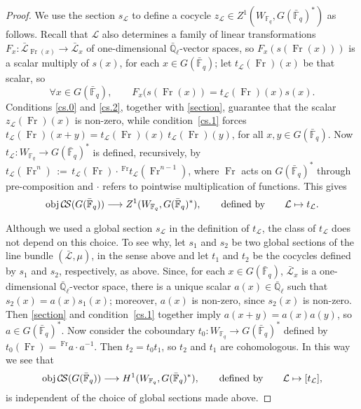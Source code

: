 \documentclass[11pt]{amsart}
\theoremstyle{plain}
\theoremstyle{definition}
\theoremstyle{remark}
\newcommand{\EE}{\mathbb{\bar Q}_\ell}
\newcommand{\bFq}{{\mathbb{\bar F}_q}}
\newcommand{\Fq}{{\mathbb{F}_q}}
\newcommand{\Frob}{{\operatorname{Fr}}}
\newcommand{\ceq}{{\, :=\, }}
\newcommand{\obj}{{\text{obj}\, }}
\newcommand{\cs}[1]{{\mathcal{#1}}}
\newcommand{\gcs}[1]{{\mathcal{\bar #1}}}
\newcommand{\CS}{{\mathcal{C\hskip-1.8pt S}}}
\newcommand\Clifton[1]{\marginpar{\smaller\smaller CC: #1}}
\begin{document}
\begin{proof}
We use the section $s_\cs{L}$ to define a cocycle $z_\cs{L} \in Z^1(W_\Fq,G(\bFq)^*)$ as follows. Recall that $\cs{L}$ also determines a family of linear transformations $F_x : \gcs{L}_{\Frob(x)} \to \gcs{L}_x$ of one-dimensional $\EE$-vector spaces,  so $F_x(s(\Frob(x)))$ is a scalar multiply of $s(x)$, for each $x\in G(\bFq)$; let $t_\cs{L}(\Frob)(x)$ be that scalar, so
\begin{equation}\label{t}
\forall x\in G(\bFq),\qquad F_{x}(s(\Frob(x)) = t_\cs{L}(\Frob)(x) s(x).
\end{equation}
Conditions \ref{cs.0} and \ref{cs.2}, together with \eqref{section}, guarantee that the scalar $z_\cs{L}(\Frob)(x)$ is non-zero, while condition~\ref{cs.1} forces $t_\cs{L}(\Frob)(x+y) = t_\cs{L}(\Frob)(x) \ t_\cs{L}(\Frob)(y)$, for all $x,y \in G(\bFq)$. 
Now $t_\cs{L} : W_\Fq \to G(\bFq)^*$ is defined, recursively, by $t_\cs{L}(\Frob^n) \ceq t_\cs{L}(\Frob)\cdot \,^\Frob t_\cs{L}(\Frob^{n-1})$, where $\Frob$ acts on $G(\bFq)^*$ through pre-composition and $\cdot$ refers to pointwise multiplication of functions. This gives
\[
\obj \CS(G(\bFq)) \longrightarrow Z^1(W_\Fq,G(\bFq)^*), \qquad \text{defined by} \qquad \cs{L} \mapsto t_\cs{L}.
\]

Although we used a global section $s_\cs{L}$ in the definition of $t_\cs{L}$, the class of $t_\cs{L}$ does not depend on this choice. To see why, let $s_1$ and $s_2$ be two global sections of the line bundle $(\gcs{L},\mu)$, in the sense above and let $t_1$ and $t_2$ be the cocycles defined by $s_1$ and $s_2$, respectively, as above. Since, for each $x\in G(\bFq)$, $\gcs{L}_x$ is a one-dimensional $\EE$-vector space, there is a unique scalar $a(x) \in \EE$ such that $s_2(x) = a(x) s_1(x)$; moreover, $a(x)$ is non-zero, since $s_2(x)$ is non-zero. Then \eqref{section} and condition~\ref{cs.1} together imply $a(x+y) = a(x)a(y)$, so $a\in G(\bFq)^*$. Now consider the  coboundary $t_0 : W_\Fq \to G(\bFq)^*$ defined by $t_0(\Frob) = \,^\Frob a \cdot a^{-1}$. Then $t_2 = t_0 t_1$, so $t_2$ and $t_1$ are cohomologous. In this way we see that
\begin{equation}\label{cohomologous}
\obj \CS(G(\bFq)) \longrightarrow H^1(W_\Fq,G(\bFq)^*), \qquad \text{defined by} \qquad \cs{L} \mapsto [t_\cs{L}],
\end{equation}
is independent of the choice of global sections made above.


\end{proof}
\end{document}
